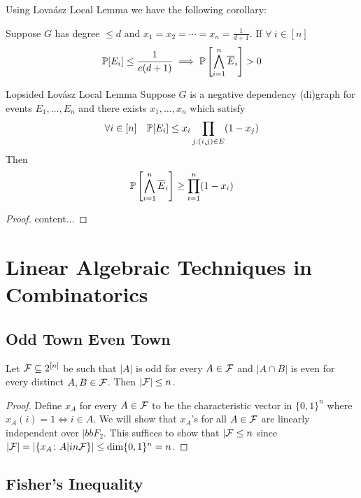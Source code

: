 Using Lova\'{a}sz Local Lemma we have the following corollary:
\begin{corolary}{}{}
	Suppose $G$ has degree $\leq d$ and $x_1=x_2=\cdots=x_n=\frac1{d+1}$. If $\forall\ i\in[n]$ $$\mathbb{P}[E_i]\leq\frac{1}{e(d+1)}\implies \mathbb{P}\left[\bigwedge_{i=1}^n\overline{E}_i\right]>0$$
\end{corolary}
\begin{Theorem}{Lopsided Lov\'{a}sz Local Lemma}{}
	Suppose $G$ is a negative dependency (di)graph for events $E_1,\dots, E_n$ and there exists $x_1,\dots, x_n$ which satisfy $$\forall i\in[n]\quad \mathbb{P}[E_i]\leq x_i\prod_{j:(i,j)\in E}(1-x_j)$$Then $$\mathbb{P}\left[\bigwedge_{i=1}^n\overline{E}_i\right]\geq \prod_{i=1}^n(1-x_i)$$
\end{Theorem}
\begin{proof}
	content...
\end{proof}
\section{Linear Algebraic Techniques in Combinatorics}
\subsection{Odd Town Even Town}
\begin{lemma}{}{}
	Let $\mathcal{F}\subseteq 2^{[n]}$ be such that $|A|$ is odd for every $A\in \mathcal{F}$ and $|A\cap B|$ is even for every distinct $A,B\in \mathcal{F}$. Then $|\mathcal{F}|\leq n$.
\end{lemma}
\begin{proof}
	Define $x_A$ for every $A\in \mathcal{F}$ to be the characteristic vector in $\{0,1\}^n$ where $x_A(i)=1\iff i\in A$. We will show that $x_A$'s for all $A\in\mathcal{F}$ are linearly independent over $|bbF_2$. This suffices to show that $|\mathcal{F}\leq n$ since $|\mathcal{F}|=|\{x_A\colon A|in\mathcal{F}\}|\leq \dim \{0,1\}^n=n$.
\end{proof}
\subsection{Fisher's Inequality}